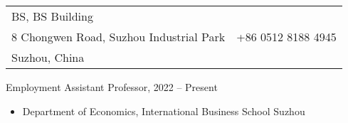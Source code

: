 \documentclass{resume_liang} %
\begin{document}
	
\begin{tabu} to \linewidth {X[l]X[r]}
BS, BS Building  & \href{mailto:lfu@albany.edu}{\color{blue}{lfu@albany.edu}} \\
8 Chongwen Road, Suzhou Industrial Park     & +86 0512 8188 4945 \\
Suzhou, China           & \href{https://liang-fu-econ.github.io/website/}{\color{blue}{https://liang-fu-econ.github.io/website/}}
\end{tabu}
\bigskip





\begin{rSection}{Employment}
Assistant Professor, {\bf \href{https://www.xjtlu.edu.cn/en/study/departments/academic-departments/economics/}{\color{black}{Xi'an Jiaotong-Liverpool University}}}  \hfill {2022 -- Present}  
\begin{itemize}
	\item[] Department of Economics, International Business School Suzhou
\end{itemize}   
\vspace{0.3cm}          
\end{rSection}
\bigskip  
\end{document}
